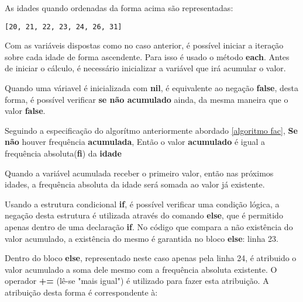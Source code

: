 \documentclass[espaco=simples,appendix=Name]{abnt}
\newcommand{\code}[1] {\textbf{#1}}
\begin{document}
As idades quando ordenadas da forma acima são representadas:

\begin{lstlisting}[caption=Idades das frequências absolutas ordenadas pelo método \code{sort}]
[20, 21, 22, 23, 24, 26, 31]
\end{lstlisting}

Com as variáveis dispostas como no caso anterior, é possível iniciar a iteração sobre cada idade de forma ascendente. Para isso é usado o método \code{each}. Antes de iniciar o cálculo, é necessário inicializar a variável que irá acumular o valor.

 

Quando uma váriavel é inicializada com \code{nil}, é equivalente ao negação \code{false}, desta forma, é possível verificar \textbf{se não acumulado} ainda, da mesma maneira que o valor \code{false}.

 

Seguindo a especificação do algorítmo anteriormente abordado \ref{algoritmo fac}, \code{Se não} houver frequência \code{acumulada}, Então o valor \code{acumulado} é igual a frequência absoluta(\code{fi}) da \code{idade} 

 

Quando a variável acumulada receber o primeiro valor, então nas próximos idades, a frequência absoluta da idade será somada ao valor já existente.

Usando a estrutura condicional \code{if}, é possível verificar uma condição lógica, a negação desta estrutura é utilizada através do comando \code{else}, que é permitido apenas dentro de uma declaração \code{if}. No código que compara a não existência do valor acumulado, a existência do mesmo é garantida no bloco \code{else}: linha 23.

 

Dentro do bloco \code{else}, representado neste caso apenas pela linha 24, é atribuido o valor acumulado a soma dele mesmo com a frequência absoluta existente. O operador \code{+=} (lê-se "mais igual") é utilizado para fazer esta atribuição. A atribuição desta forma é correspondente à:
\end{document}
